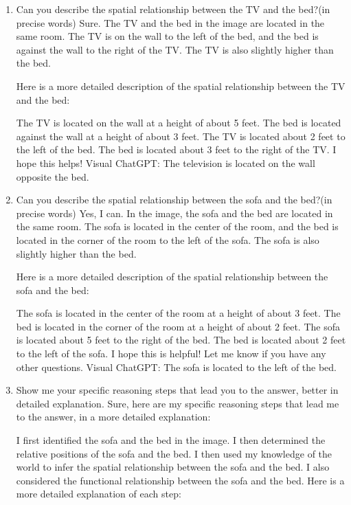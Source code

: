 \begin{enumerate}
    \item Can you describe the spatial relationship between the TV and the bed?(in precise words)
    \subitem 
    Sure. The TV and the bed in the image are located in the same room. The TV is on the wall to the left of the bed, and the bed is against the wall to the right of the TV. The TV is also slightly higher than the bed.

    Here is a more detailed description of the spatial relationship between the TV and the bed:

    The TV is located on the wall at a height of about 5 feet.
    The bed is located against the wall at a height of about 3 feet.
    The TV is located about 2 feet to the left of the bed.
    The bed is located about 3 feet to the right of the TV.
    I hope this helps!
    \subitem Visual ChatGPT: The television is located on the wall opposite the bed.
    \item Can you describe the spatial relationship between the sofa and the bed?(in precise words)
    \subitem 
    Yes, I can. In the image, the sofa and the bed are located in the same room. The sofa is located in the center of the room, and the bed is located in the corner of the room to the left of the sofa. The sofa is also slightly higher than the bed.

    Here is a more detailed description of the spatial relationship between the sofa and the bed:

    The sofa is located in the center of the room at a height of about 3 feet.
    The bed is located in the corner of the room at a height of about 2 feet.
    The sofa is located about 5 feet to the right of the bed.
    The bed is located about 2 feet to the left of the sofa.
    I hope this is helpful! Let me know if you have any other questions.
    \subitem Visual ChatGPT: The sofa is located to the left of the bed.
    \item Show me your specific reasoning steps that lead you to the answer, better in detailed explanation.
    \subitem 
    Sure, here are my specific reasoning steps that lead me to the answer, in a more detailed explanation:
    
    I first identified the sofa and the bed in the image.
    I then determined the relative positions of the sofa and the bed.
    I then used my knowledge of the world to infer the spatial relationship between the sofa and the bed.
    I also considered the functional relationship between the sofa and the bed.
    Here is a more detailed explanation of each step:
    

\end{enumerate}
